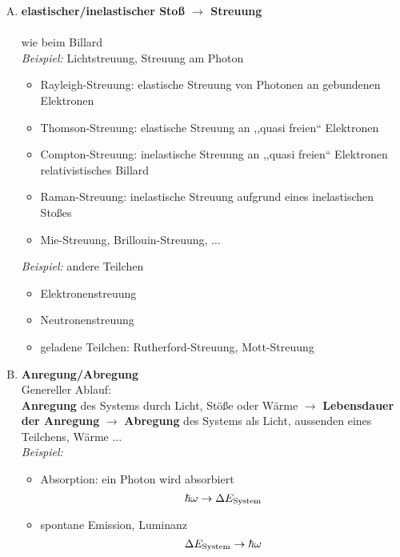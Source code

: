 \begin{enumerate}[A)]
	\item \textbf{ elastischer/inelastischer Stoß $ \rightarrow $ Streuung}\\
	\\
	wie beim Billard\\[5pt]
	\emph{Beispiel:} Lichtstreuung, Streuung am Photon
	\begin{itemize}
		\item Rayleigh-Streuung: elastische Streuung von Photonen an gebundenen Elektronen
		\item Thomson-Streuung: elastische Streuung an ,,quasi freien`` Elektronen
		\item Compton-Streuung: inelastische Streuung an ,,quasi freien`` Elektronen\\
		relativistisches Billard
		\item Raman-Streuung: inelastische Streuung aufgrund eines inelastischen Stoßes
		\item Mie-Streuung, Brillouin-Streuung, $ \dots $
	\end{itemize}
	\emph{Beispiel:} andere Teilchen
	\begin{itemize}
		\item Elektronenstreuung
		\item Neutronenstreuung
		\item geladene Teilchen: Rutherford-Streuung, Mott-Streuung
	\end{itemize}
	\item \textbf{Anregung/Abregung}\\
	Genereller Ablauf:\\
	\textbf{Anregung} des Systems durch Licht, Stöße oder Wärme $ \rightarrow $ \textbf{Lebensdauer der Anregung} $ \rightarrow $ \textbf{Abregung} des Systems als Licht, aussenden eines Teilchens, Wärme $ \dots $\\[5pt]
	\emph{Beispiel:}
	\begin{itemize}
		\item Absorption: ein Photon wird absorbiert
		\begin{equation*}
		\hbar \omega \rightarrow \Delta E_{\textrm{System}}
		\end{equation*}
		\item spontane Emission, Luminanz
		\begin{equation*}
		\Delta E_{\tx{System}} \rightarrow \hbar \omega

\end{equation*}
\end{itemize}
\end{enumerate}
